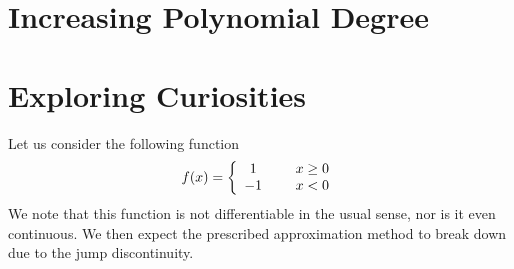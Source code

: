 \documentclass{article}
\begin{document}
\section{Increasing Polynomial Degree}

\section{Exploring Curiosities}
Let us consider the following function
\begin{align*}
	f(x) = \left\{ \begin{array}{cc} 
                1 & \hspace{5mm} x \ge 0 \\
                -1 & \hspace{5mm} x < 0 
                \end{array} \right.
\end{align*}
We note that this function is not differentiable in the usual sense, nor is it even continuous. We then expect the prescribed approximation method to break down due to the jump discontinuity. 
\end{document}

